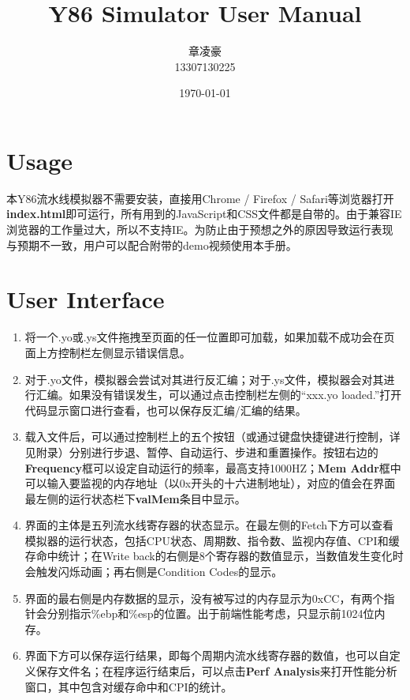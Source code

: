 \documentclass[12pt]{article}
\begin{document}
\pagestyle{fancy}
\lhead{\textbf{{\thetitle}}}
\rhead{\textbf{\nouppercase{\firstleftmark}}}
\cfoot{\thepage}

\title{\textbf{Y86 Simulator User Manual}}
\author{章凌豪\\13307130225}
\date{\today}
\maketitle


\vspace{42pt}

\section{Usage}

本Y86流水线模拟器不需要安装，直接用Chrome / Firefox / Safari等浏览器打开{\bf index.html}即可运行，所有用到的JavaScript和CSS文件都是自带的。由于兼容IE浏览器的工作量过大，所以不支持IE。为防止由于预想之外的原因导致运行表现与预期不一致，用户可以配合附带的demo视频使用本手册。

\section{User Interface}

\begin{enumerate}
\item 将一个.yo或.ys文件拖拽至页面的任一位置即可加载，如果加载不成功会在页面上方控制栏左侧显示错误信息。
\item 对于.yo文件，模拟器会尝试对其进行反汇编；对于.ys文件，模拟器会对其进行汇编。如果没有错误发生，可以通过点击控制栏左侧的“xxx.yo loaded.”打开代码显示窗口进行查看，也可以保存反汇编/汇编的结果。
\item 载入文件后，可以通过控制栏上的五个按钮（或通过键盘快捷键进行控制，详见附录）分别进行步退、暂停、自动运行、步进和重置操作。按钮右边的{\bf Frequency}框可以设定自动运行的频率，最高支持1000HZ；{\bf Mem Addr}框中可以输入要监视的内存地址（以0x开头的十六进制地址），对应的值会在界面最左侧的运行状态栏下{\bf valMem}条目中显示。
\item 界面的主体是五列流水线寄存器的状态显示。在最左侧的Fetch下方可以查看模拟器的运行状态，包括CPU状态、周期数、指令数、监视内存值、CPI和缓存命中统计；在Write back的右侧是8个寄存器的数值显示，当数值发生变化时会触发闪烁动画；再右侧是Condition Codes的显示。
\item 界面的最右侧是内存数据的显示，没有被写过的内存显示为0xCC，有两个指针会分别指示\%ebp和\%esp的位置。出于前端性能考虑，只显示前1024位内存。
\item 界面下方可以保存运行结果，即每个周期内流水线寄存器的数值，也可以自定义保存文件名；在程序运行结束后，可以点击{\bf Perf Analysis}来打开性能分析窗口，其中包含对缓存命中和CPI的统计。
\end{enumerate}
\end{document}
